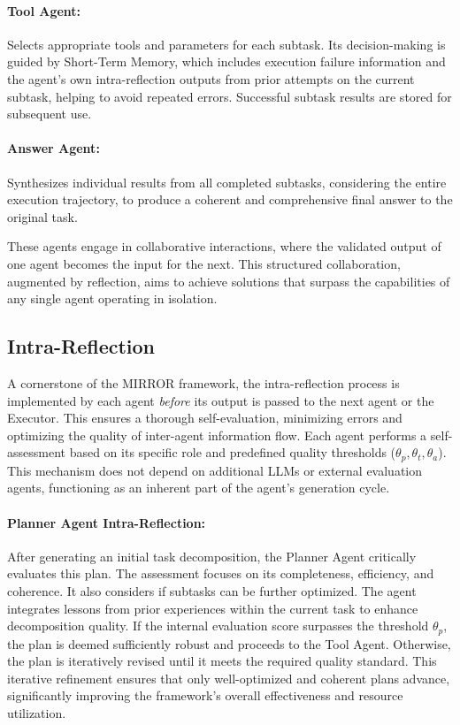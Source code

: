 \documentclass{article}
\begin{document}
\paragraph{Tool Agent:} Selects appropriate tools and parameters for each subtask. Its decision-making is guided by Short-Term Memory, which includes execution failure information and the agent's own intra-reflection outputs from prior attempts on the current subtask, helping to avoid repeated errors. Successful subtask results are stored for subsequent use.

\paragraph{Answer Agent:} Synthesizes individual results from all completed subtasks, considering the entire execution trajectory, to produce a coherent and comprehensive final answer to the original task.

These agents engage in collaborative interactions, where the validated output of one agent becomes the input for the next. This structured collaboration, augmented by reflection, aims to achieve solutions that surpass the capabilities of any single agent operating in isolation.

\subsection{Intra-Reflection}
A cornerstone of the MIRROR framework, the intra-reflection process is implemented by each agent \textit{before} its output is passed to the next agent or the Executor. This ensures a thorough self-evaluation, minimizing errors and optimizing the quality of inter-agent information flow. Each agent performs a self-assessment based on its specific role and predefined quality thresholds ($\theta_p, \theta_t, \theta_a$). This mechanism does not depend on additional LLMs or external evaluation agents, functioning as an inherent part of the agent's generation cycle.

\paragraph{Planner Agent Intra-Reflection:} After generating an initial task decomposition, the Planner Agent critically evaluates this plan. The assessment focuses on its completeness, efficiency, and coherence. It also considers if subtasks can be further optimized. The agent integrates lessons from prior experiences within the current task to enhance decomposition quality. If the internal evaluation score surpasses the threshold $\theta_p$, the plan is deemed sufficiently robust and proceeds to the Tool Agent. Otherwise, the plan is iteratively revised until it meets the required quality standard. This iterative refinement ensures that only well-optimized and coherent plans advance, significantly improving the framework's overall effectiveness and resource utilization.
\end{document}
